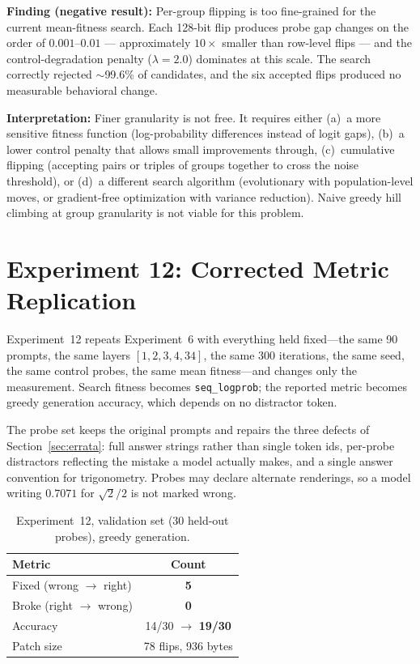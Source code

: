 \documentclass[11pt,a4paper]{article}
\begin{document}
\textbf{Finding (negative result):} Per-group flipping is too
fine-grained for the current mean-fitness search. Each 128-bit flip
produces probe gap changes on the order of $0.001$--$0.01$ ---
approximately $10\times$ smaller than row-level flips --- and the
control-degradation penalty ($\lambda=2.0$) dominates at this scale.
The search correctly rejected $\sim$99.6\% of candidates, and the
six accepted flips produced no measurable behavioral change.

\textbf{Interpretation:} Finer granularity is not free. It requires
either (a)~a more sensitive fitness function (log-probability
differences instead of logit gaps), (b)~a lower control penalty that
allows small improvements through, (c)~cumulative flipping (accepting
pairs or triples of groups together to cross the noise threshold), or
(d)~a different search algorithm (evolutionary with population-level
moves, or gradient-free optimization with variance reduction). Naive
greedy hill climbing at group granularity is not viable for this
problem.

\section{Experiment 12: Corrected Metric Replication}
\label{sec:exp12}

Experiment~12 repeats Experiment~6 with everything held fixed---the same 90
prompts, the same layers $[1,2,3,4,34]$, the same 300 iterations, the same seed,
the same control probes, the same mean fitness---and changes only the
measurement. Search fitness becomes \texttt{seq\_logprob}; the reported metric
becomes greedy generation accuracy, which depends on no distractor token.

The probe set keeps the original prompts and repairs the three defects of
Section~\ref{sec:errata}: full answer strings rather than single token ids,
per-probe distractors reflecting the mistake a model actually makes, and a single
answer convention for trigonometry. Probes may declare alternate renderings, so a
model writing $0.7071$ for $\sqrt{2}/2$ is not marked wrong.

\begin{table}[h]
\centering
\caption{Experiment~12, validation set (30 held-out probes), greedy generation.}
\begin{tabular}{lc}
\toprule
Metric & Count \\
\midrule
Fixed (wrong $\to$ right) & \textbf{5} \\
Broke (right $\to$ wrong) & \textbf{0} \\
Accuracy & 14/30 $\to$ \textbf{19/30} \\
Patch size & 78 flips, 936 bytes \\
\bottomrule
\end{tabular}
\end{table}
\end{document}
